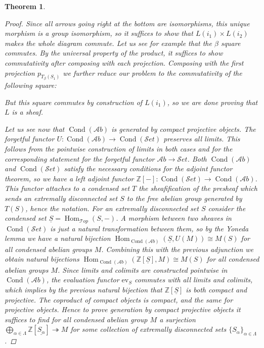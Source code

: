 \documentclass[11pt,A4]{article}
\theoremstyle{plain}
\newtheorem{thm}{Theorem}[section]
\theoremstyle{definition}
\theoremstyle{remark}
\newcommand{\Z}{\mathbb{Z}}
\newcommand{\Top}{\mathscr{T}op}
\newcommand{\Ab}{\mathscr{A}b}
\newcommand{\Set}{\mathscr{S}et}
\DeclareMathOperator{\Hom}{Hom}
\DeclareMathOperator{\Cond}{Cond}
\renewcommand{\u}[1]{\underline{#1}}
\newcommand{\ev}{\mathrm{ev}}
\begin{document}
\begin{thm}
\begin{proof}
	Since all arrows going right at the bottom are isomorphisms, this unique morphism is a group isomorphism, so it suffices to show that $L(i_{1})\times L(i_{2})$ makes the whole diagram commute.
	Let us see for example that the $\beta$ square commutes.
	By the universal property of the product, it suffices to show commutativity after composing with each projection.
	Composing with the first projection $p_{T_{\beta}(S_{1})}$ we further reduce our problem to the commutativity of the following square:
	\begin{center}
	\end{center}
	But this square commutes by construction of $L(i_{1})$, so we are done proving that $L$ is a sheaf.

	Let us see now that $\Cond(\Ab)$ is generated by compact projective objects.
	The forgetful functor $U\colon \Cond(\Ab)\to \Cond(\Set)$ preserves all limits.
	This follows from the pointwise construction of limits in both cases and for the corresponding statement for the forgetful functor $\Ab\to \Set$.
	Both $\Cond(\Ab)$ and $\Cond(\Set)$ satisfy the necessary conditions for the adjoint functor theorem, so we have a left adjoint functor $\Z[-]\colon\Cond(\Set)\to \Cond(\Ab)$.
	This functor attaches to a condensed set $T$ the sheafification of the presheaf which sends an extremally disconnected set $S$ to the free abelian group generated by $T(S)$, hence the notation.
	For an extremally disconnected set $S$ consider the condensed set $\u{S}=\Hom_{\Top}(S,-)$.
	A morphism between two sheaves in $\Cond(\Set)$ is just a natural transformation between them, so by the Yoneda lemma we have a natural bijection $\Hom_{\Cond(\Ab)}(\u{S},U(M))\cong M(S)$ for all condensed abelian groups $M$.
	Combining this with the previous adjunction we obtain natural bijections $\Hom_{\Cond(\Ab)}(\Z[\u{S}],M)\cong M(S)$ for all condensed abelian groups $M$.
	Since limits and colimits are constructed pointwise in $\Cond(\Ab)$, the evaluation functor $\ev_{S}$ commutes with all limits and colimits, which implies by the previous natural bijection that $\Z[\u{S}]$ is both compact and projective.
	The coproduct of compact objects is compact, and the same for projective objects.
	Hence to prove generation by compact projective objects it suffices to find for all condensed abelian group $M$ a surjection $\bigoplus_{\alpha \in \Lambda}\Z[\u{S_{\alpha}}]\twoheadrightarrow M$ for some collection of extremally disconnected sets $\{S_{\alpha}\}_{\alpha\in \Lambda}$.
	

\end{proof}
\end{thm}
\end{document}
